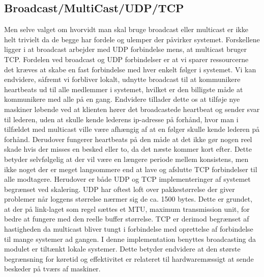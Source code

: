 \documentclass[a4paper,12pt]{article}
\begin{document}
\subsection{Broadcast/MultiCast/UDP/TCP}
Men selve valget om hvorvidt man skal bruge broadcast eller multicast er ikke helt trivielt da de begge har fordele og ulemper der påvirker systemet. Forskellene ligger i at broadcast arbejder med UDP forbindelse mens, at multicast bruger TCP.
Fordelen ved broadcast og UDP forbindelser er at vi sparer ressourcerne det kræves at skabe en fast forbindelse med hver enkelt følger i systemet. Vi kan endvidere, såfremt vi forbliver lokalt, udnytte broadcast til at kommunikere heartbeats ud til alle medlemmer i systemet, hvilket er den billigste måde at kommunikere med alle på en gang. Endvidere tillader dette os at tilføje nye maskiner løbende ved at klienten hører det broadcastede heartbeat og sender svar til lederen, uden at skulle kende lederens ip-adresse på forhånd, hvor man i tilfældet med multicast ville være afhængig af at en følger skulle kende lederen på forhånd. Derudover fungerer heartbeats på den måde at det ikke gør nogen reel skade hvis der misses en besked eller to, da det næste kommer kort efter. Dette betyder selvfølgelig at der vil være en længere periode mellem konsistens, men ikke noget der er meget langsommere end at lave og afslutte TCP forbindelser til alle modtagere.
Herudover er både UDP og TCP implementeringer af systemet begrænset ved skalering.
UDP har oftest loft over pakkestørrelse der giver problemer når loggens størrelse nærmer sig de ca. 1500 bytes. Dette er grundet, at der på link-laget som regel sættes et MTU, maximum transmission unit, for bedre at fungere med den reelle buffer størrelse. TCP er derimod begrænset af hastigheden da multicast bliver tungt i forbindelse med oprettelse af forbindelse til mange systemer ad gangen. 
I denne implementation benyttes broadcasting da modulet er tiltænkt lokale systemer.
Dette betyder endvidere at den største begrænsning for køretid og effektivitet er relateret til hardwaremæssigt at sende beskeder på tværs af maskiner.
\end{document}
